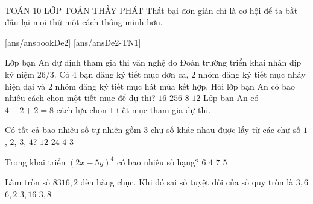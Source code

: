 ﻿﻿\begin{name}
	{\tenchude}
	{TOÁN 10}
	{LỚP TOÁN THẦY PHÁT}
	{Thất bại đơn giản chỉ là cơ hội để ta bắt đầu lại mọi thứ một cách thông minh hơn.}
\end{name}
[ans/ansbookDe2]
\TN
{}[ans/ansDe2-TN1]
\begin{ex}%
Lớp bạn An dự định tham gia thi văn nghệ do Đoàn trường triển khai nhân dịp kỷ niệm 26/3. Có $4$ bạn đăng ký tiết mục đơn ca, $2$ nhóm đăng ký tiết mục nhảy hiện đại và $2$ nhóm đăng ký tiết mục hát múa kết hợp. Hỏi lớp bạn An có bao nhiêu cách chọn một tiết mục để dự thi?
\choice
{$16$}
{$256$}
{\True $8$}
{$12$}
\loigiai
{Lớp bạn An có $4+2+2=8$ cách lựa chọn $1$ tiết mục tham gia dự thi.}
\end{ex}

\begin{ex}%
Có tất cả bao nhiêu số tự nhiên gồm $3$ chữ số khác nhau được lấy từ các chữ số $1$, $2$, $3$, $4$?
\choice
{$12$}
{\True $24$}
{$4$}
{$3$}
\end{ex}

\begin{ex}%
Trong khai triển $(2x - 5y)^4$ có bao nhiêu số hạng?
\choice
{$6$}
{$4$}
{$7$}
{\True $5$}
\end{ex}

\begin{ex}%
	Làm tròn số $8316{,}2$ đến hàng chục. Khi đó sai số tuyệt đối của số quy tròn là
	\choice
	{$3{,}6$}
	{$6{,}2$}
	{$3{,}16$}
	{\True $3{,}8$}
\end{ex}

